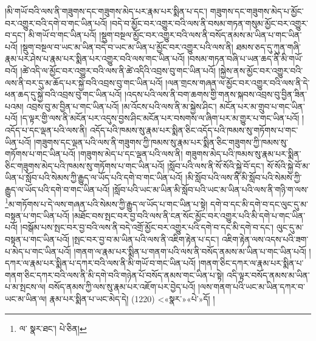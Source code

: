 །མི་གཡོ་བའི་ལས་ནི་གཟུགས་དང་གཟུགས་མེད་པར་རྣམ་པར་སྨིན་པ་དང་། གཟུགས་དང་གཟུགས་མེད་པ་མྱོང་བར་འགྱུར་བའི་དགེ་བ་གང་ཡིན་པའོ། །བདེ་བ་མྱོང་བར་འགྱུར་བའི་ལས་ནི་བསམ་གཏན་གསུམ་མྱོང་བར་འགྱུར་བ་དང་། མི་གཡོ་བ་གང་ཡིན་པའོ། །སྡུག་བསྔལ་མྱོང་བར་འགྱུར་བའི་ལས་ནི་བསོད་ནམས་མ་ཡིན་པ་གང་ཡིན་པའོ། །སྡུག་བསྔལ་བ་ཡང་མ་ཡིན་བདེ་བ་ཡང་མ་ཡིན་པ་མྱོང་བར་འགྱུར་པའི་ལས་ནི། ཐམས་ཅད་དུ་ཀུན་གཞི་རྣམ་པར་ཤེས་པ་རྣམ་པར་སྨིན་པར་འགྱུར་བའི་ལས་གང་ཡིན་པའོ། །བསམ་གཏན་བཞི་པ་ཡན་ཆད་ནི་མི་གཡོ་བའོ། །ཚེ་འདི་ལ་མྱོང་བར་འགྱུར་བའི་ལས་ནི་ཚེ་འདིའི་འབྲས་བུ་གང་ཡིན་པའོ། །སྐྱེས་ནས་མྱོང་བར་འགྱུར་བའི་ལས་ནི་བར་དུ་མ་ཆོད་པར་སྐྱེ་བའི་འབྲས་བུ་གང་ཡིན་པའོ། །ལན་གྲངས་གཞན་ལ་མྱོང་བར་འགྱུར་བའི་ལས་ནི་དེ་ཕན་ཆད་དུ་སྐྱེ་བའི་འབྲས་བུ་གང་ཡིན་པའོ། །འདས་པའི་ལས་ནི་བག་ཆགས་གྱི་གནས་སྐབས་འབྲས་བུ་བྱིན་ཟིན་པའམ། འབྲས་བུ་མ་བྱིན་པ་གང་ཡིན་པའོ། །མ་འོངས་པའི་ལས་ནི་མ་སྐྱེས་ཤིང་། མངོན་པར་མ་གྲུབ་པ་གང་ཡིན་པའོ། །ད་ལྟར་གྱི་ལས་ནི་མངོན་པར་འདུས་བྱས་ཤིང་མངོན་པར་བསགས་ལ་ཞིག་པར་མ་གྱུར་པ་གང་ཡིན་པའོ། །འདོད་པ་དང་ལྡན་པའི་ལས་ནི། འདོད་པའི་ཁམས་སུ་རྣམ་པར་སྨིན་ཅིང་འདོད་པའི་ཁམས་སུ་གཏོགས་པ་གང་ཡིན་པའོ། །གཟུགས་དང་ལྡན་པའི་ལས་ནི་གཟུགས་ཀྱི་ཁམས་སུ་རྣམ་པར་སྨིན་ཅིང་གཟུགས་ཀྱི་ཁམས་སུ་གཏོགས་པ་གང་ཡིན་པའོ། །གཟུགས་མེད་པ་དང་ལྡན་པའི་ལས་ནི། གཟུགས་མེད་པའི་ཁམས་སུ་རྣམ་པར་སྨིན་ཅིང་གཟུགས་མེད་པའི་ཁམས་སུ་གཏོགས་པ་གང་ཡིན་པའོ། །སློབ་པའི་ལས་ནི་སོ་སོའི་སྐྱེ་བོ་དང་། སོ་སོའི་སྐྱེ་བོ་མ་ཡིན་པ་སློབ་པའི་སེམས་ཀྱི་རྒྱུད་ལ་ཡོད་པའི་དགེ་བ་གང་ཡིན་པའོ། །མི་སློབ་པའི་ལས་ནི་མི་སློབ་པའི་སེམས་ཀྱི་རྒྱུད་ལ་ཡོད་པའི་དགེ་བ་གང་ཡིན་པའོ། །སློབ་པའི་ཡང་མ་ཡིན་མི་སློབ་པའི་ཡང་མ་ཡིན་པའི་ལས་ནི་གཉི་ག་ལས་\footnote{ལ་  སྣར་ཐང་།  པེ་ཅིན། }མ་གཏོགས་པ་དེ་ལས་གཞན་པའི་སེམས་ཀྱི་རྒྱུད་ལ་ཡོད་པ་གང་ཡིན་པ་སྟེ། དགེ་བ་དང་མི་དགེ་བ་དང་ལུང་དུ་མ་བསྟན་པ་གང་ཡིན་པའོ། །མཐོང་བས་སྤང་བར་བྱ་བའི་ལས་ནི་ངན་སོང་མྱོང་བར་འགྱུར་པའི་མི་དགེ་པ་གང་ཡིན་པའོ། །བསྒོམ་པས་སྤང་བར་བྱ་བའི་ལས་ནི་བདེ་འགྲོ་མྱོང་བར་འགྱུར་པའི་དགེ་བ་དང་མི་དགེ་བ་དང་། ལུང་དུ་མ་བསྟན་པ་གང་ཡིན་པའོ། །སྤང་བར་བྱ་བ་མ་ཡིན་པའི་ལས་ནི་འཇིག་རྟེན་པ་དང་། འཇིག་རྟེན་ལས་འདས་པའི་ཟག་པ་མེད་པ་གང་ཡིན་པའོ། །གནག་ལ་རྣམ་པར་སྨིན་པ་གནག་པའི་ལས་ནི་བསོད་ནམས་མ་ཡིན་པ་གང་ཡིན་པའོ། །དཀར་ལ་རྣམ་པར་སྨིན་པ་དཀར་བའི་ལས་ནི་མི་གཡོ་བ་གང་ཡིན་པའོ། །གནག་ཅིང་དཀར་ལ་རྣམ་པར་སྨིན་པ་གནག་ཅིང་དཀར་བའི་ལས་ནི་མི་དགེ་བའི་གཉེན་པོ་བསོད་ནམས་གང་ཡིན་པ་སྟེ། འདི་ལྟར་བསོད་ནམས་མ་ཡིན་པ་མ་སྤངས་ལ། བསོད་ནམས་ཀྱི་ལས་སུ་རྣམ་པར་འཇོག་པར་བྱེད་པའོ། །ལས་གནག་པའི་ཡང་མ་ཡིན་དཀར་བ་ཡང་མ་ཡིན་ལ། རྣམ་པར་སྨིན་པ་ཡང་མེད་དེ། (1220) <«སྣར་»«པེ་»དོ། །

